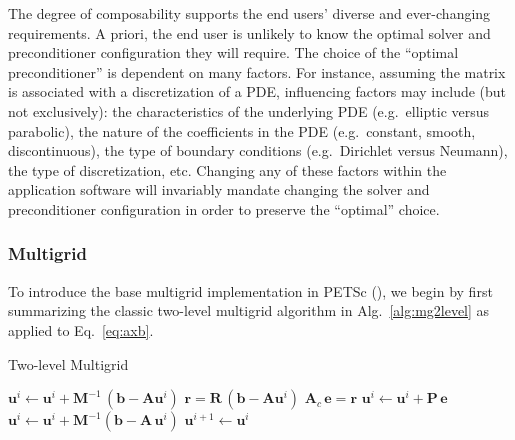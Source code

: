 \documentclass[]{siamart0216}
\newcommand{\dmat}[1]{\mathbf{#1}}
\newcommand{\dvec}[1]{\mathbf{#1}}
\begin{document}
The degree of composability supports the end users' diverse and ever-changing requirements. 
A priori, the end user is unlikely to know the optimal solver and preconditioner configuration they will require. 
The choice of the ``optimal preconditioner'' is dependent on many factors. For instance, assuming the matrix 
is associated with a discretization of a PDE, influencing factors may include (but not exclusively): 
the characteristics of the underlying PDE (e.g.~elliptic versus parabolic), 
the nature of the coefficients in the PDE (e.g.~constant, smooth, discontinuous), 
the type of boundary conditions (e.g.~Dirichlet versus Neumann), 
the type of discretization, etc.
Changing any of these factors within the application software will invariably 
mandate changing the solver and preconditioner configuration in order to preserve the ``optimal'' choice.

\subsubsection{Multigrid}
To introduce the base multigrid implementation in PETSc (), we begin by 
first summarizing the classic two-level multigrid algorithm in Alg.~\ref{alg:mg2level} 
as applied to Eq.~\eqref{eq:axb}.
\begin{algorithm}
\caption{Two-level Multigrid}\label{alg:mg2level}
\begin{algorithmic}[1]
\State{Given $\dmat A$, $\dmat M$, $\dmat R$, $\dmat P$, $\dmat A_c$, $\dvec b$}
\State{Choose ${\dvec u}^0$}
\Repeat
\State ${\dvec u}^i \leftarrow {\dvec u}^i + {\dmat M}^{-1}\,({\dvec b} - \dmat A \dvec u^i)$
\State ${\dvec r} = {\dmat R}\,({\dvec b} - \dmat A \dvec u^i)$
\State ${\dmat A_c}\,{\dvec e} = {\dvec r}$
\State ${\dvec u}^i \leftarrow {\dvec u}^i + {\dmat P}\, {\dvec e}$
\State ${\dvec u}^i \leftarrow {\dvec u}^i +{\dmat M}^{-1} ({\dvec b} - {\dmat A}\,{\dvec u}^i )$
\State ${\dvec u}^{i+1} \leftarrow {\dvec u}^i$
\end{algorithmic}
\end{algorithm}
\end{document}
